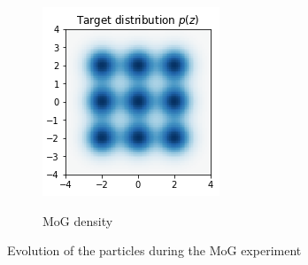 \begin{figure}[!htb]
\begin{subfigure}[b]{0.2\textwidth}
        \includegraphics[width=\textwidth]{img/target.png}\label{fig:3x3gauss}
        \caption{MoG density}
        \label{fig:mouse}
    \end{subfigure}
    \caption{Evolution of the particles during the MoG experiment}\label{fig:mog}
\end{figure}

